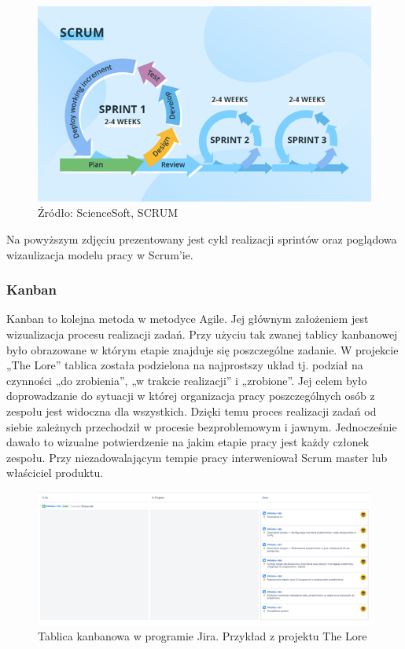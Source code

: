 \documentclass[oneside,polski,logo]{amuthesis}
\begin{document}
\begin{figure}[h]
	\centering
	\includegraphics[width=13cm]{images/hyps/scrum.png}
	\caption{Źródło: ScienceSoft, SCRUM}
\end{figure}

Na powyższym zdjęciu prezentowany jest cykl realizacji sprintów oraz poglądowa wizaulizacja modelu pracy w Scrum'ie. \\ 

\subsubsection{Kanban}
Kanban to kolejna metoda w metodyce Agile. Jej głównym założeniem jest wizualizacja procesu realizacji zadań. Przy użyciu tak zwanej tablicy kanbanowej było obrazowane w którym etapie znajduje się poszczególne zadanie. W projekcie „The Lore” tablica została podzielona na najprostszy układ tj. podział na czynności „do zrobienia”, „w trakcie realizacji” i  „zrobione”. Jej celem było doprowadzanie do sytuacji w której organizacja pracy poszczególnych osób z zespołu jest widoczna dla wszystkich. Dzięki temu proces realizacji zadań od siebie zależnych przechodził w procesie bezproblemowym i jawnym. Jednocześnie dawało to wizualne potwierdzenie na jakim etapie pracy jest każdy członek zespołu. Przy niezadowalającym tempie pracy interweniował Scrum master lub właściciel produktu.\cite{kanban}\\


\begin{figure}[h]
	\centering
	\includegraphics[width=15cm]{images/hyps/jira.png}
	\caption{Tablica kanbanowa w programie Jira. Przykład z projektu The Lore}
\end{figure}
\end{document}
